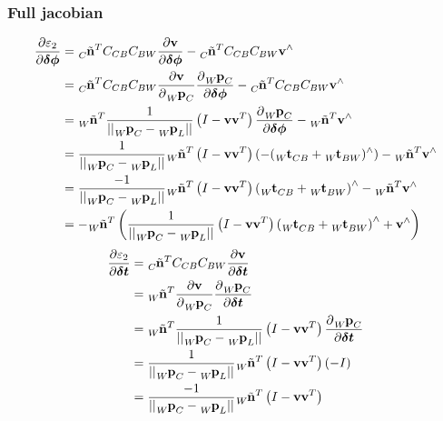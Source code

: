 \documentclass[10pt,a4paper]{article}
\numberwithin{equation}{section}
\renewcommand{\vec}[1]{\ensuremath{\mathbf{#1}}}
\newcommand{\vecs}[1]{\ensuremath{\boldsymbol{#1}}}
\newcommand{\norm}[1]{\ensuremath{\left|\left|#1\right|\right|}}
\begin{document}
\subsubsection{Full jacobian}
\begin{align}
\frac{\partial\varepsilon_2}{\partial\vecs{\delta\phi}} &= \tensor[_C]{\tilde{\vec{n}}}{^T} C_{CB} C_{BW}\frac{\partial \vec{v}}{\partial\vecs{\delta\phi}} - \tensor[_C]{\tilde{\vec{n}}}{^T} C_{CB} C_{BW}\vec{v}^\wedge\\
&= \tensor[_C]{\tilde{\vec{n}}}{^T} C_{CB} C_{BW}\frac{\partial \vec{v}}{\partial\tensor[_W]{\vec{p}}{_C}} 
\frac{\partial \tensor[_W]{\vec{p}}{_{C}}}{\partial \vecs{\delta\phi}}
 - \tensor[_C]{\tilde{\vec{n}}}{^T} C_{CB} C_{BW}\vec{v}^\wedge\\
&= \tensor[_W]{\tilde{\vec{n}}}{^T}
\frac{1}{\norm{\tensor[_W]{\vec{p}}{_C} - \tensor[_W]{\vec{p}}{_L}}}
\left(
I - \vec{v}\vec{v}^T
\right)
\frac{\partial \tensor[_W]{\vec{p}}{_{C}}}{\partial \vecs{\delta\phi}}
 - \tensor[_W]{\tilde{\vec{n}}}{^T} \vec{v}^\wedge\\
 &= \frac{1}{\norm{\tensor[_W]{\vec{p}}{_C} - \tensor[_W]{\vec{p}}{_L}}}\tensor[_W]{\tilde{\vec{n}}}{^T}
\left(
I - \vec{v}\vec{v}^T
\right)
\left(-(\tensor[_W]{\vec{t}}{_{CB}} + \tensor[_W]{\vec{t}}{_{BW}})^\wedge\right)
 - \tensor[_W]{\tilde{\vec{n}}}{^T} \vec{v}^\wedge\\
 &=\frac{-1}{\norm{\tensor[_W]{\vec{p}}{_C} - \tensor[_W]{\vec{p}}{_L}}}\tensor[_W]{\tilde{\vec{n}}}{^T}
\left(
I - \vec{v}\vec{v}^T
\right)
\left(\tensor[_W]{\vec{t}}{_{CB}} + \tensor[_W]{\vec{t}}{_{BW}}\right)^\wedge
 - \tensor[_W]{\tilde{\vec{n}}}{^T} \vec{v}^\wedge\\
&=-\tensor[_W]{\tilde{\vec{n}}}{^T}\left(\frac{1}{\norm{\tensor[_W]{\vec{p}}{_C} - \tensor[_W]{\vec{p}}{_L}}}
\left(
I - \vec{v}\vec{v}^T
\right)
\left(\tensor[_W]{\vec{t}}{_{CB}} + \tensor[_W]{\vec{t}}{_{BW}}\right)^\wedge + \vec{v}^\wedge\right)
\end{align}
\begin{align}
\frac{\partial\varepsilon_2}{\partial\vecs{\delta t}} &= 
\tensor[_C]{\tilde{\vec{n}}}{^T} C_{CB} C_{BW}\frac{\partial\vec{v}}{\partial \vecs{\delta t}}\\
&= 
\tensor[_W]{\tilde{\vec{n}}}{^T} 
\frac{\partial \vec{v}}{\partial\tensor[_W]{\vec{p}}{_C}}
\frac{\partial \tensor[_W]{\vec{p}}{_C}}{\partial \vecs{\delta t}}\\
&=
\tensor[_W]{\tilde{\vec{n}}}{^T} 
\frac{1}{\norm{\tensor[_W]{\vec{p}}{_C} - \tensor[_W]{\vec{p}}{_L}}}
\left(
I - \vec{v}\vec{v}^T
\right)
\frac{\partial \tensor[_W]{\vec{p}}{_C}}{\partial \vecs{\delta t}}\\
&=
\frac{1}{\norm{\tensor[_W]{\vec{p}}{_C} - \tensor[_W]{\vec{p}}{_L}}}
\tensor[_W]{\tilde{\vec{n}}}{^T}
\left(
I - \vec{v}\vec{v}^T
\right)
(-I)\\
&=\frac{-1}{\norm{\tensor[_W]{\vec{p}}{_C} - \tensor[_W]{\vec{p}}{_L}}}
\tensor[_W]{\tilde{\vec{n}}}{^T}
\left(
I - \vec{v}\vec{v}^T
\right)
\end{align}
\end{document}
